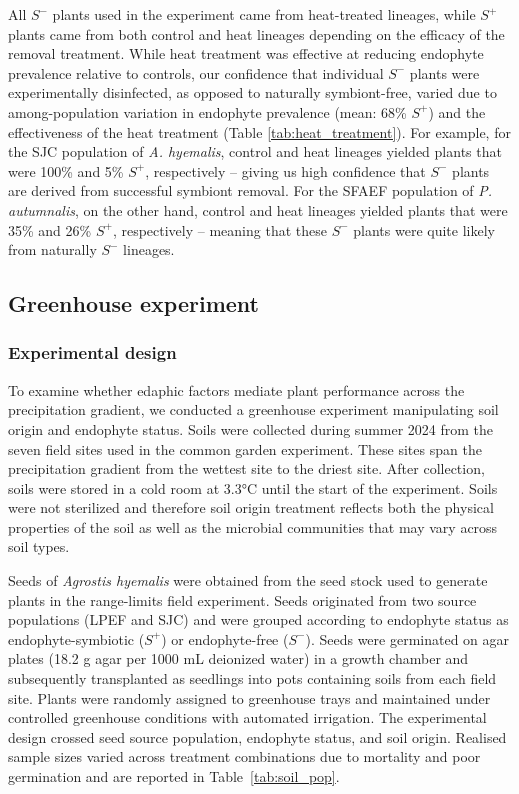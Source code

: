 \documentclass[12pt]{article}\usepackage[]{graphicx}\usepackage[dvipsnames]{xcolor}
\begin{document}
All $S^-$ plants used in the experiment came from heat-treated lineages, while $S^+$ plants came from both control and heat lineages depending on the efficacy of the removal treatment. 
While heat treatment was effective at reducing endophyte prevalence relative to controls, our confidence that individual $S^-$ plants were experimentally disinfected, as opposed to naturally symbiont-free, varied due to among-population variation in endophyte prevalence (mean: 68\% $S^+$) and the effectiveness of the heat treatment (Table \ref{tab:heat_treatment}). 
For example, for the SJC population of \emph{A. hyemalis}, control and heat lineages yielded plants that were 100\% and 5\% $S^+$, respectively -- giving us high confidence that $S^-$ plants are derived from successful symbiont removal. 
For the SFAEF population of \emph{P. autumnalis}, on the other hand, control and heat lineages yielded plants that were 35\% and 26\% $S^+$, respectively -- meaning that these $S^-$ plants were quite likely from naturally $S^-$ lineages.


\subsection{Greenhouse experiment}
\label{sec:greenhouse}

\subsubsection{Experimental design}

To examine whether edaphic factors mediate plant performance across the precipitation gradient, we conducted a greenhouse experiment
manipulating soil origin and endophyte status.
Soils were collected during summer 2024 from the seven field sites used in the common garden experiment.
These sites span the precipitation gradient from the wettest site to the driest site. 
After collection, soils were stored in a cold room at 3.3°C until the start of the experiment. 
Soils were not sterilized and therefore soil origin treatment reflects both the physical properties of the soil as well as the microbial communities that may vary across soil types.

Seeds of \textit{Agrostis hyemalis} were obtained from the seed stock used to generate plants in the range-limits field experiment. 
Seeds originated from two source populations (LPEF and SJC) and were grouped according to endophyte status as endophyte-symbiotic ($S^+$) or endophyte-free ($S^-$).
Seeds were germinated on agar plates (18.2 g agar per 1000 mL deionized water) in a growth chamber and subsequently transplanted as seedlings
into pots containing soils from each field site. 
Plants were randomly assigned to greenhouse trays and maintained under controlled greenhouse conditions with automated irrigation.
The experimental design crossed seed source population, endophyte status, and soil origin. 
Realised sample sizes varied across treatment combinations due to mortality and poor germination and are reported in Table~\ref{tab:soil_pop}.
\end{document}
